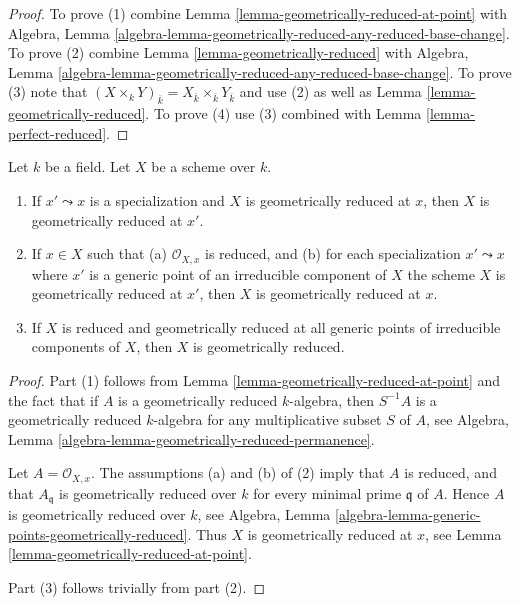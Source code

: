 \begin{proof}
To prove (1) combine Lemma \ref{lemma-geometrically-reduced-at-point}
with Algebra, Lemma
\ref{algebra-lemma-geometrically-reduced-any-reduced-base-change}.
To prove (2) combine Lemma \ref{lemma-geometrically-reduced}
with Algebra, Lemma
\ref{algebra-lemma-geometrically-reduced-any-reduced-base-change}.
To prove (3) note that
$(X \times_k Y)_{\overline{k}} =
X_{\overline{k}} \times_{\overline{k}} Y_{\overline{k}}$
and use (2) as well as Lemma \ref{lemma-geometrically-reduced}.
To prove (4) use (3) combined with Lemma \ref{lemma-perfect-reduced}.
\end{proof}

\begin{lemma}
\label{lemma-generic-points-geometrically-reduced}
Let $k$ be a field.
Let $X$ be a scheme over $k$.
\begin{enumerate}
\item If $x' \leadsto x$ is a specialization and $X$ is geometrically
reduced at $x$, then $X$ is geometrically reduced at $x'$.
\item If $x \in X$ such that (a) $\mathcal{O}_{X, x}$
is reduced, and (b) for each specialization $x' \leadsto x$ where
$x'$ is a generic point of an irreducible component of $X$ the
scheme $X$ is geometrically reduced at $x'$, then $X$ is geometrically
reduced at $x$.
\item If $X$ is reduced and geometrically reduced at all generic
points of irreducible components of $X$, then $X$ is geometrically
reduced.
\end{enumerate}
\end{lemma}

\begin{proof}
Part (1) follows from
Lemma \ref{lemma-geometrically-reduced-at-point}
and the fact that if $A$ is a geometrically reduced
$k$-algebra, then $S^{-1}A$ is a geometrically reduced $k$-algebra for
any multiplicative subset $S$ of $A$, see
Algebra, Lemma \ref{algebra-lemma-geometrically-reduced-permanence}.

\medskip\noindent
Let $A = \mathcal{O}_{X, x}$. The assumptions (a) and (b) of (2) imply
that $A$ is reduced, and that $A_{\mathfrak q}$ is geometrically
reduced over $k$ for every minimal prime $\mathfrak q$ of $A$.
Hence $A$ is geometrically reduced over $k$, see
Algebra, Lemma \ref{algebra-lemma-generic-points-geometrically-reduced}.
Thus $X$ is geometrically reduced at $x$, see
Lemma \ref{lemma-geometrically-reduced-at-point}.

\medskip\noindent
Part (3) follows trivially from part (2).
\end{proof}

